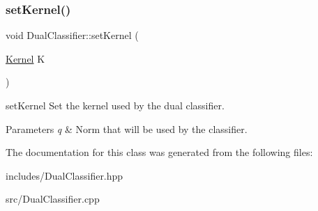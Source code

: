\subsubsection{\texorpdfstring{set\+Kernel()}{setKernel()}}
{\footnotesize\ttfamily void Dual\+Classifier\+::set\+Kernel (\begin{DoxyParamCaption}\item[{\hyperlink{class_kernel}{Kernel}}]{K }\end{DoxyParamCaption})}



set\+Kernel Set the kernel used by the dual classifier. 


\begin{DoxyParams}{Parameters}
{\em q} & Norm that will be used by the classifier. \\
\hline
\end{DoxyParams}


The documentation for this class was generated from the following files\+:\begin{DoxyCompactItemize}
\item 
includes/Dual\+Classifier.\+hpp\item 
src/Dual\+Classifier.\+cpp\end{DoxyCompactItemize}
